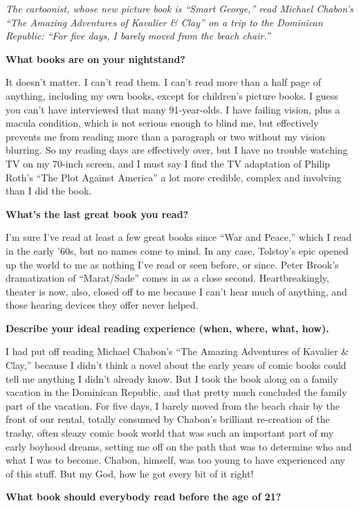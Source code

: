 \emph{The cartoonist, whose new picture book is ``Smart George,'' read
Michael Chabon's ``The Amazing Adventures of Kavalier \& Clay'' on a
trip to the Dominican Republic: ``For five days, I barely moved from the
beach chair.''}

\textbf{What books are on your nightstand?}

It doesn't matter. I can't read them. I can't read more than a half page
of anything, including my own books, except for children's picture
books. I guess you can't have interviewed that many 91-year-olds. I have
failing vision, plus a macula condition, which is not serious enough to
blind me, but effectively prevents me from reading more than a paragraph
or two without my vision blurring. So my reading days are effectively
over, but I have no trouble watching TV on my 70-inch screen, and I must
say I find the TV adaptation of Philip Roth's ``The Plot Against
America'' a lot more credible, complex and involving than I did the
book.

\textbf{What's the last great book you read?}

I'm sure I've read at least a few great books since ``War and Peace,''
which I read in the early '60s, but no names come to mind. In any case,
Tolstoy's epic opened up the world to me as nothing I've read or seen
before, or since. Peter Brook's dramatization of ``Marat/Sade'' comes in
as a close second. Heartbreakingly, theater is now, also, closed off to
me because I can't hear much of anything, and those hearing devices they
offer never helped.

\textbf{Describe your ideal reading experience (when, where, what,
how).}

I had put off reading Michael Chabon's ``The Amazing Adventures of
Kavalier \& Clay,'' because I didn't think a novel about the early years
of comic books could tell me anything I didn't already know. But I took
the book along on a family vacation in the Dominican Republic, and that
pretty much concluded the family part of the vacation. For five days, I
barely moved from the beach chair by the front of our rental, totally
consumed by Chabon's brilliant re-creation of the trashy, often sleazy
comic book world that was such an important part of my early boyhood
dreams, setting me off on the path that was to determine who and what I
was to become. Chabon, himself, was too young to have experienced any of
this stuff. But my God, how he got every bit of it right!

\textbf{What book should everybody read before the age of 21?}

